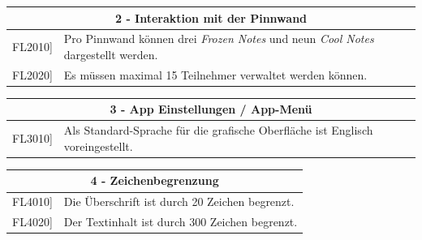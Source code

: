 \documentclass[a4paper]{scrreprt}
\begin{document}
    		\vspace{5mm}
    		
    		\begin{table}[h!]
    			\centering
    			\label{my-label}
    			\begin{tabular}{p{2cm}p{12cm}}
    				
    				\multicolumn{2}{c}{\textbf{2 - Interaktion mit der Pinnwand}} \\ \hline
    				\centering{[}FL2010{]} & Pro Pinnwand können drei \textit{Frozen Notes} und neun \textit{Cool Notes} dargestellt werden.\\
    				\centering{[}FL2020{]}& Es müssen maximal 15 Teilnehmer verwaltet werden können.                             \\ 
    				\hline
    			\end{tabular}
    		\end{table}
    		
    		\vspace{5mm}
    		
    		\begin{table}[h!]
    			\centering
    			\label{my-label}
    			\begin{tabular}{p{2cm}p{12cm}}
    				
    				\multicolumn{2}{c}{\textbf{3 - App Einstellungen / App-Menü}} \\ \hline
    				\centering{[}FL3010{]} & Als Standard-Sprache für die grafische Oberfläche ist Englisch voreingestellt.\\
    				\hline
    			\end{tabular}
    		\end{table}
    		
    		\vspace{5mm}
    		
    		\begin{table}[h!]
    			\centering
    			\label{my-label}
    			\begin{tabular}{p{2cm}p{12cm}}
    				
    				\multicolumn{2}{c}{\textbf{4 - Zeichenbegrenzung}} \\ \hline
    				\centering{[}FL4010{]} & Die Überschrift ist durch 20 Zeichen begrenzt.\\
    				\centering{[}FL4020{]}& Der Textinhalt ist durch 300 Zeichen begrenzt.                              \\
    				\hline
    			\end{tabular}
    		\end{table}
    		
\end{document}
